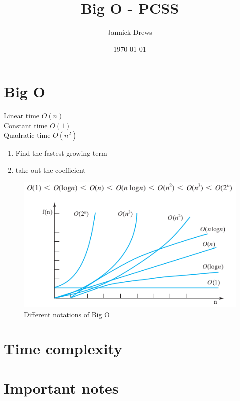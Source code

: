 \documentclass{article}
\title{Big O - PCSS}
\author{Jannick Drews}
\date{\today}
\begin{document}
\maketitle
\newpage
\section{Big O}
\begin{centering}
  Linear time $O(n)$\\
  Constant time $O(1)$\\
  Quadratic time $O(n^2)$\\
\end{centering}
\begin{enumerate}
  \item Find the fastest growing term
  \item take out the coefficient
\end{enumerate}
\begin{figure}
  \centering
  \includegraphics[scale=.5]{img/Selection_022.png}
  \caption{Different notations of Big O}
  \label{fig:notations}
\end{figure}

\section{Time complexity}


\section{Important notes}
\end{document}
